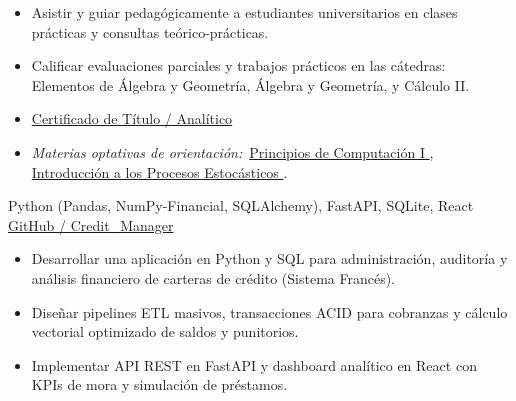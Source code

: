 \documentclass{CV_template}
\begin{document}
\begin{itemize}
    \item Asistir y guiar pedagógicamente a estudiantes universitarios en clases prácticas y consultas teórico-prácticas.
    \item Calificar evaluaciones parciales y trabajos prácticos en las cátedras: Elementos de Álgebra y Geometría, Álgebra y Geometría, y Cálculo II.
\end{itemize}


\begin{itemize}
    \item \href{https://1drv.ms/b/s!Anr_tvZIYrhwhLl3kbwqZnLPbGGHFg?e=MsCJnp}{Certificado de Título / Analítico {\footnotesize\faExternalLink}}
    \item \textit{Materias optativas de orientación:}\ \href{https://1drv.ms/b/s!Anr_tvZIYrhwg-Q3BLmxwlzX5PWIFQ}{Principios de Computación I {\footnotesize\faExternalLink}}, \href{https://1drv.ms/b/s!Anr_tvZIYrhwg-Q45aG0UgNb-R70FA?e=44lo7C}{Introducción a los Procesos Estocásticos {\footnotesize\faExternalLink}}.
\end{itemize}

\newpage


{Python (Pandas, NumPy-Financial, SQLAlchemy), FastAPI, SQLite, React}
{\href{https://github.com/JuanMCarini/Credit_Manager}{GitHub / Credit\_Manager {\footnotesize\faExternalLink}}}
\begin{itemize}
    \item Desarrollar una aplicación en Python y SQL para administración, auditoría y análisis financiero de carteras de crédito (Sistema Francés).
    \item Diseñar pipelines ETL masivos, transacciones ACID para cobranzas y cálculo vectorial optimizado de saldos y punitorios.
    \item Implementar API REST en FastAPI y dashboard analítico en React con KPIs de mora y simulación de préstamos.
\end{itemize}
\end{document}

